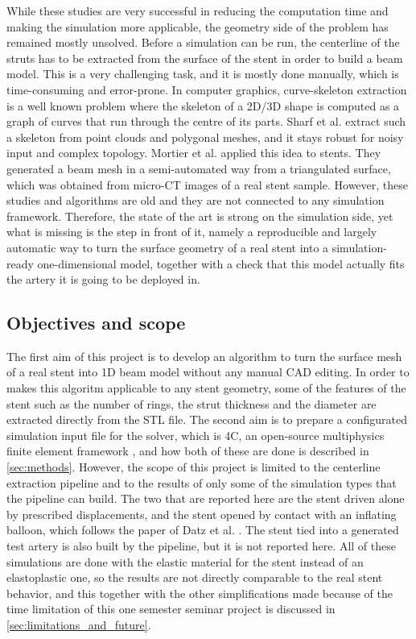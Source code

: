 While these studies are very successful in reducing the computation time and making the simulation more applicable, the geometry side of the problem has remained mostly unsolved. Before a simulation can be run, the centerline of the struts has to be extracted from the surface of the stent in order to build a beam model. This is a very challenging task, and it is mostly done manually, which is time-consuming and error-prone. In computer graphics, curve-skeleton extraction is a well known problem where the skeleton of a 2D/3D shape is computed as a graph of curves that run through the centre of its parts. Sharf et al. \citep{sharf2007} extract such a skeleton from point clouds and polygonal meshes, and it stays robust for noisy input and complex topology. Mortier et al. \citep{mortier2008} applied this idea to stents. They generated a beam mesh in a semi-automated way from a triangulated surface, which was obtained from micro-CT images of a real stent sample. However, these studies and algorithms are old and they are not connected to any simulation framework. Therefore, the state of the art is strong on the simulation side, yet what is missing is the step in front of it, namely a reproducible and largely automatic way to turn the surface geometry of a real stent into a simulation-ready one-dimensional model, together with a check that this model actually fits the artery it is going to be deployed in.


\subsection{Objectives and scope}
\label{sec:objectives}

The first aim of this project is to develop an algorithm to turn the surface mesh of a real stent into 1D beam model without any manual CAD editing. In order to makes this algoritm applicable to any stent geometry, some of the features of the stent such as the number of rings, the strut thickness and the diameter are extracted directly from the STL file. The second aim is to prepare a configurated simulation input file for the solver, which is 4C, an open-source multiphysics finite element framework \citep{4c2026}, and how both of these are done is described in \cref{sec:methods}. However, the scope of this project is limited to the centerline extraction pipeline and to the results of only some of the simulation types that the pipeline can build. The two that are reported here are the stent driven alone by prescribed displacements, and the stent opened by contact with an inflating balloon, which follows the paper of Datz et al. \citep{datz2025}. The stent tied into a generated test artery is also built by the pipeline, but it is not reported here. All of these simulations are done with the elastic material for the stent instead of an elastoplastic one, so the results are not directly comparable to the real stent behavior, and this together with the other simplifications made because of the time limitation of this one semester seminar project is discussed in \cref{sec:limitations_and_future}.
